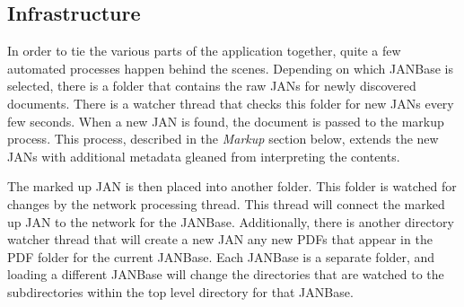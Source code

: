 \documentclass{article}
\begin{document}
\begin{doublespace}
\section{Infrastructure}
In order to tie the various parts of the application together,
quite a few automated processes happen behind the scenes.
Depending on which JANBase is selected, there is a folder that contains the raw JANs for newly discovered documents.
There is a watcher thread that checks this folder for new JANs every few seconds.
When a new JAN is found, the document is passed to the markup process.
This process, described in the {\it Markup} section below, extends the new JANs with additional metadata gleaned
from interpreting the contents.
\par
The marked up JAN is then placed into another folder.
This folder is watched for changes by the network processing thread.
This thread will connect the marked up JAN to the network for the JANBase.
Additionally, there is another directory watcher thread that will create a new JAN any new PDFs that appear in
the PDF folder for the current JANBase.
Each JANBase is a separate folder, and loading a different JANBase will change the directories that are watched
to the subdirectories within the top level directory for that JANBase. 

\end{doublespace}
\end{document}
